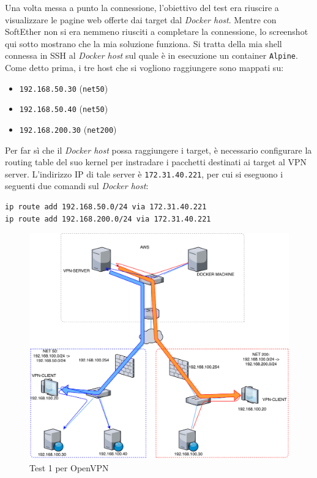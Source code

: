 Una volta messa a punto la connessione, l'obiettivo del test era riuscire a visualizzare
le pagine web offerte dai target dal \textit{Docker host}.
Mentre con SoftEther non si era nemmeno riusciti a completare la connessione, lo
screenshot qui sotto mostrano che la mia soluzione funziona. Si tratta della mia
shell connessa in SSH al \textit{Docker host} sul quale è in esecuzione un container
\texttt{Alpine}. Come detto prima, i tre host che si vogliono raggiungere sono
mappati su:
\begin{itemize}
  \item \texttt{192.168.50.30} (\texttt{net50})
  \item \texttt{192.168.50.40} (\texttt{net50})
  \item \texttt{192.168.200.30} (\texttt{net200})
\end{itemize}
Per far sì che il \textit{Docker host} possa raggiungere i target, è necessario
configurare la routing table del suo kernel per instradare i pacchetti destinati
ai target al VPN server. L'indirizzo IP di tale server è \texttt{172.31.40.221},
per cui si eseguono i seguenti due comandi sul \textit{Docker host}:
\begin{verbatim}
ip route add 192.168.50.0/24 via 172.31.40.221
ip route add 192.168.200.0/24 via 172.31.40.221
\end{verbatim}

\begin{figure}
  \includegraphics[scale=0.6]{img/openvpn_test1}
  \caption{Test 1 per OpenVPN}
  \label{fig:openvpn-test1}
\end{figure}

